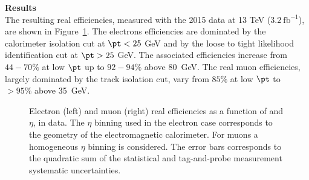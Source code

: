 \par{\bf Results\\}
The resulting real efficiencies, measured with the 2015 data at 13 TeV ($3.2~\mathrm{fb}^{-1}$), are shown in Figure~\ref{Fig:Results_realEff}. The electrons efficiencies are dominated by the calorimeter isolation cut at $\pt < 25$ GeV and by the loose to tight likelihood identification cut at $\pt > 25$ GeV. The associated efficiencies increase from $44-70\%$ at low $\pt$ up to $92-94\%$ above 80~GeV. The real muon efficiencies, largely dominated by the track isolation cut, vary from $85\%$ at low $\pt$ to $>95\%$ above 35~GeV. \\
  
\begin{figure}[h!]
\centering
{}
\vspace{-0.2cm}
\caption{Electron (left) and muon (right) real efficiencies as a function of \pt and $\eta$, in data. The $\eta$ binning used in the electron case corresponds to the geometry of the electromagnetic calorimeter. For muons a homogeneous $\eta$ binning is considered. The error bars corresponds to the quadratic sum of the statistical and tag-and-probe measurement systematic uncertainties.}
\label{Fig:Results_realEff}  
\end{figure}


